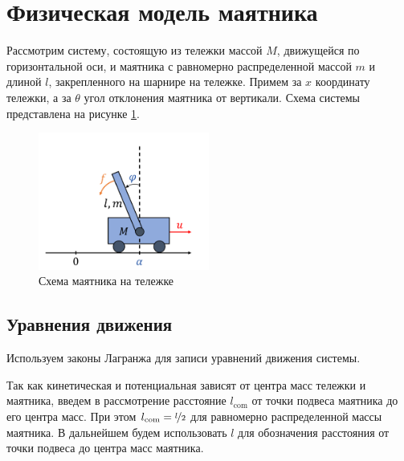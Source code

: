 \section{Физическая модель маятника}

Рассмотрим систему, состоящую из тележки массой $M$, движущейся по горизонтальной оси, и маятника с равномерно распределенной массой $m$ и длиной $l$,
закрепленного на шарнире на тележке. Примем за $x$ координату тележки, а за $\theta$ угол отклонения маятника от вертикали. Схема системы представлена на рисунке \ref{fig:pendulum}.
\begin{figure}[ht!]
    \centering
    \includegraphics[width=0.5\textwidth]{media/cart.png}
    \caption{Схема маятника на тележке}
    \label{fig:pendulum}
\end{figure}

\subsection{Уравнения движения}
Используем законы Лагранжа для записи уравнений движения системы. 

Так как кинетическая и потенциальная зависят от центра масс тележки и маятника, введем в рассмотрение расстояние $l_{\text{com}}$ 
от точки подвеса маятника до его центра масс. При этом $l_{\text{com}} = \nicefrac{l}{2}$ для равномерно распределенной массы маятника.
В дальнейшем будем использовать $l$ для обозначения расстояния от точки подвеса до центра масс маятника. 

